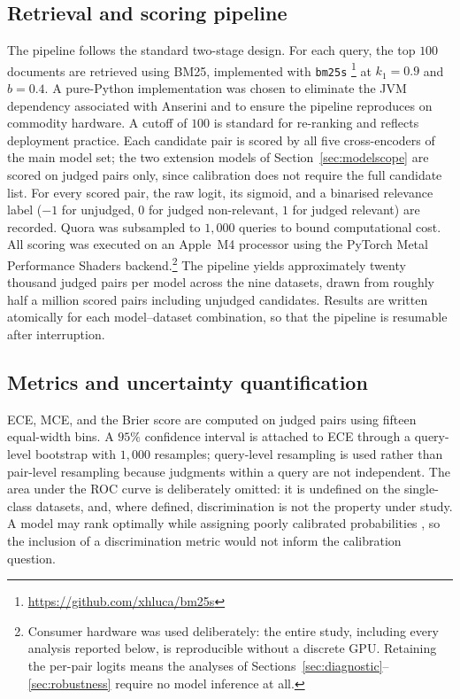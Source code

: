 \documentclass[sn-mathphys-num,pdflatex]{sn-jnl}
\begin{document}
\subsection{Retrieval and scoring pipeline}\label{sec:pipeline}
The pipeline follows the standard two-stage design. For each query, the top $100$
documents are retrieved using BM25, implemented with \texttt{bm25s}
\cite{bm25s2024}\footnote{\url{https://github.com/xhluca/bm25s}} at $k_1=0.9$ and
$b=0.4$. A pure-Python implementation was chosen
to eliminate the JVM dependency associated with Anserini and to ensure the
pipeline reproduces on commodity hardware. A cutoff of $100$ is standard for
re-ranking and reflects deployment practice. Each candidate pair is scored by all
five cross-encoders of the main model set; the two extension models of
Section~\ref{sec:modelscope} are scored on judged pairs only, since calibration does
not require the full candidate list. For every scored pair, the raw logit, its
sigmoid, and a
binarised relevance label ($-1$ for unjudged, $0$ for judged non-relevant, $1$
for judged relevant) are recorded. Quora was subsampled to $1{,}000$ queries to
bound computational cost. All scoring was executed on an Apple~M4 processor using
the PyTorch Metal Performance Shaders backend.\footnote{Consumer hardware was used
deliberately: the entire study, including every analysis reported below, is
reproducible without a discrete GPU. Retaining the per-pair logits means the
analyses of Sections~\ref{sec:diagnostic}--\ref{sec:robustness} require no model
inference at all.} The pipeline yields approximately twenty
thousand judged pairs per model across the nine datasets, drawn from roughly half
a million scored pairs including unjudged candidates. Results are written
atomically for each model--dataset combination, so that the pipeline is resumable
after interruption.

\subsection{Metrics and uncertainty quantification}\label{sec:metrics}
ECE, MCE, and the Brier score are computed on judged pairs using fifteen
equal-width bins. A $95\%$ confidence interval is attached to ECE through a
query-level bootstrap with $1{,}000$ resamples; query-level resampling is used
rather than pair-level resampling because judgments within a query are not
independent. The area under the ROC curve is deliberately omitted: it is undefined
on the single-class datasets, and, where defined, discrimination is not the
property under study. A model may rank optimally while assigning poorly calibrated
probabilities \cite{degroot1983}, so the inclusion of a discrimination metric
would not inform the calibration question.
\end{document}
